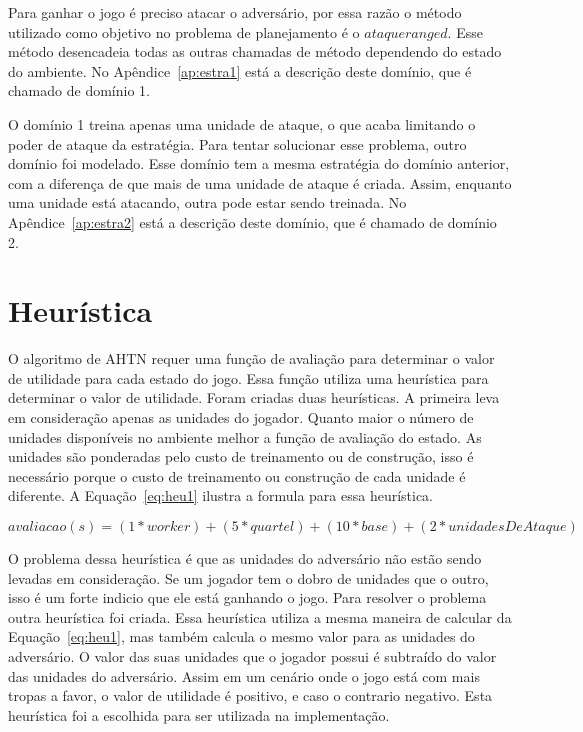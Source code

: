 Para ganhar o jogo é preciso atacar o adversário, por essa razão o método utilizado como objetivo no problema de planejamento é o $ataqueranged$.
Esse método desencadeia todas as outras chamadas de método dependendo do estado do ambiente.
No Apêndice~\ref{ap:estra1} está a descrição deste domínio, que é chamado de domínio 1.

O domínio 1 treina apenas uma unidade de ataque, o que acaba limitando o poder de ataque da estratégia.
Para tentar solucionar esse problema, outro domínio foi modelado.
Esse domínio tem a mesma estratégia do domínio anterior, com a diferença de que mais de uma unidade de ataque é criada.
Assim, enquanto uma unidade está atacando, outra pode estar sendo treinada.
No Apêndice~\ref{ap:estra2} está a descrição deste domínio, que é chamado de domínio 2.


\section{Heurística}

O algoritmo de AHTN requer uma função de avaliação para determinar o valor de utilidade para cada estado do jogo. Essa função utiliza uma heurística para determinar o valor de utilidade.
Foram criadas duas heurísticas.
A primeira leva em consideração apenas as unidades do jogador.
Quanto maior o número de unidades disponíveis no ambiente melhor a função de avaliação do estado.
As unidades são ponderadas pelo custo de treinamento ou de construção, isso é necessário porque o custo de treinamento ou construção de cada unidade é diferente.
A Equação~\ref{eq:heu1} ilustra a formula para essa heurística.

\begin{equation}
\label{eq:heu1}	
avaliacao(s) =  (1*worker) + (5 * quartel) + (10 * base) + (2 * unidadesDeAtaque)
\end{equation}

O problema dessa heurística é que as unidades do adversário não estão sendo levadas em consideração.
Se um jogador tem o dobro de unidades que o outro, isso é um forte indicio que ele está ganhando o jogo.
Para resolver o problema outra heurística foi criada.
Essa heurística utiliza a mesma maneira de calcular da Equação~\ref{eq:heu1}, mas também calcula o mesmo valor para as unidades do adversário. 
O valor das suas unidades que o jogador possui é subtraído do valor das unidades do adversário. 
Assim em um cenário onde o jogo está com mais tropas a favor, o valor de utilidade é positivo, e caso o contrario negativo.
Esta heurística foi a escolhida para ser utilizada na implementação.

